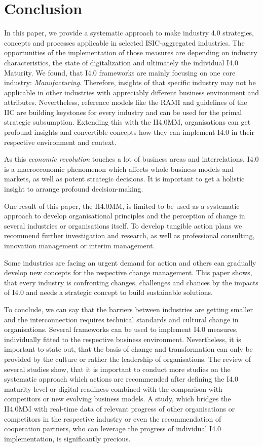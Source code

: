 \section{Conclusion}

In this paper, we provide a systematic approach to make industry 4.0 strategies, concepts and processes applicable in selected \ac{ISIC}-aggregated industries. The opportunities of the implementation of those measures are depending on industry characteristics, the state of digitalization and ultimately the individual \ac{I4.0} Maturity. We found, that \ac{I4.0} frameworks are mainly focusing on one core industry: \emph{Manufacturing}. Therefore, insights of that specific industry may not be applicable in other industries with appreciably different business environment and attributes. Nevertheless, reference models like the \ac{RAMI} and guidelines of the \ac{IIC} are building keystones for every industry and can be used for the primal strategic subsumption. Extending this with the \ac{II4.0MM}, organisations can get profound insights and convertible concepts how they can implement \ac{I4.0} in their respective environment and context.

As this \emph{economic revolution} touches a lot of business areas and interrelations, \ac{I4.0} is a macroeconomic phenomenon which affects whole business models and markets, as well as potent strategic decisions. It is important to get a holistic insight to arrange profound decision-making.

One result of this paper, the \ac{II4.0MM}, is limited to be used as a systematic approach to develop organisational principles and the perception of change in several industries or organisations itself. To develop tangible action plans we recommend further investigation and research, as well as professional consulting, innovation management or interim management.

Some industries are facing an urgent demand for action and others can gradually develop new concepts for the respective change management. This paper shows, that every industry is confronting changes, challenges and chances by the impacts of \ac{I4.0} and needs a strategic concept to build sustainable solutions.

To conclude, we can say that the barriers between industries are getting smaller and the interconnection requires technical standards and cultural change in organisations. Several frameworks can be used to implement \ac{I4.0} measures, individually fitted to the respective business environment. Nevertheless, it is important to state out, that the basis of change and transformation can only be provided by the culture or rather the leadership of organisations. The review of several studies show, that it is important to conduct more studies on the systematic approach which actions are recommended after defining the \ac{I4.0} maturity level or digital readiness combined with the comparison with competitors or new evolving business models. A study, which bridges the \ac{II4.0MM} with real-time data of relevant progress of other organisations or competitors in the respective industry or even the recommendation of cooperation partners, who can leverage the progress of individual \ac{I4.0} implementation, is significantly precious.